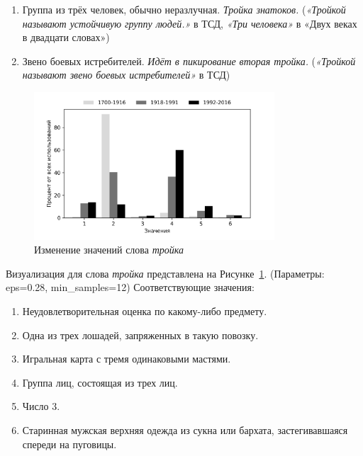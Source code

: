 \documentclass[LI,VKR]{HSEUniversity}
\begin{document}
\begin{enumerate}
    \item Группа из трёх человек, обычно неразлучная. \textit{Тройка знатоков.}
    (\textit{«Тройкой называют устойчивую группу людей.»} в ТСД,
    \textit{«Три человека»} в «Двух веках в двадцати словах»)

    \item Звено боевых истребителей. \textit{Идёт в пикирование вторая тройка.}
    (\textit{«Тройкой называют звено боевых истребителей»} в ТСД)
\end{enumerate}

%

\begin{figure}[H]
	\centering
	\includegraphics[width=0.8\textwidth]{img/visualizations/trojka_minimal}
	\caption{Изменение значений слова \textit{тройка}}
	\label{fig:Тройка}
\end{figure}

Визуализация для слова \textit{тройка} представлена на Рисунке~\ref{fig:Тройка}.
(Параметры: eps=0.28, min\_samples=12)
Соответствующие значения:
\begin{enumerate}
    \item Неудовлетворительная оценка по какому-либо предмету.
    \item Одна из трех лошадей, запряженных в такую повозку.
    \item Игральная карта с тремя одинаковыми мастями.
    \item Группа лиц, состоящая из трех лиц.
    \item Число 3.
    \item Старинная мужская верхняя одежда из сукна или бархата, застегивавшаяся спереди на пуговицы.
\end{enumerate}
\end{document}
